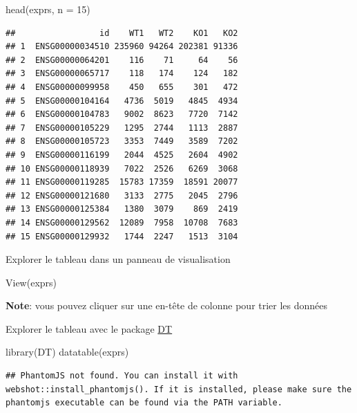 \documentclass[
]{book}
\newenvironment{Shaded}{\begin{snugshade}}{\end{snugshade}}
\newcommand{\AttributeTok}[1]{\textcolor[rgb]{0.77,0.63,0.00}{#1}}
\newcommand{\DecValTok}[1]{\textcolor[rgb]{0.00,0.00,0.81}{#1}}
\newcommand{\FunctionTok}[1]{\textcolor[rgb]{0.00,0.00,0.00}{#1}}
\newcommand{\NormalTok}[1]{#1}
\begin{document}
\begin{Shaded}
\begin{Highlighting}[]
\FunctionTok{head}\NormalTok{(exprs, }\AttributeTok{n =} \DecValTok{15}\NormalTok{)}
\end{Highlighting}
\end{Shaded}

\begin{verbatim}
##                 id    WT1   WT2    KO1   KO2
## 1  ENSG00000034510 235960 94264 202381 91336
## 2  ENSG00000064201    116    71     64    56
## 3  ENSG00000065717    118   174    124   182
## 4  ENSG00000099958    450   655    301   472
## 5  ENSG00000104164   4736  5019   4845  4934
## 6  ENSG00000104783   9002  8623   7720  7142
## 7  ENSG00000105229   1295  2744   1113  2887
## 8  ENSG00000105723   3353  7449   3589  7202
## 9  ENSG00000116199   2044  4525   2604  4902
## 10 ENSG00000118939   7022  2526   6269  3068
## 11 ENSG00000119285  15783 17359  18591 20077
## 12 ENSG00000121680   3133  2775   2045  2796
## 13 ENSG00000125384   1380  3079    869  2419
## 14 ENSG00000129562  12089  7958  10708  7683
## 15 ENSG00000129932   1744  2247   1513  3104
\end{verbatim}

Explorer le tableau dans un panneau de visualisation

\begin{Shaded}
\begin{Highlighting}[]
\FunctionTok{View}\NormalTok{(exprs)}
\end{Highlighting}
\end{Shaded}

\textbf{Note}: vous pouvez cliquer sur une en-tête de colonne pour trier les données

Explorer le tableau avec le package \href{https://rstudio.github.io/DT/}{DT}

\begin{Shaded}
\begin{Highlighting}[]
\FunctionTok{library}\NormalTok{(DT)}
\FunctionTok{datatable}\NormalTok{(exprs)}
\end{Highlighting}
\end{Shaded}

\begin{verbatim}
## PhantomJS not found. You can install it with webshot::install_phantomjs(). If it is installed, please make sure the phantomjs executable can be found via the PATH variable.
\end{verbatim}
\end{document}
